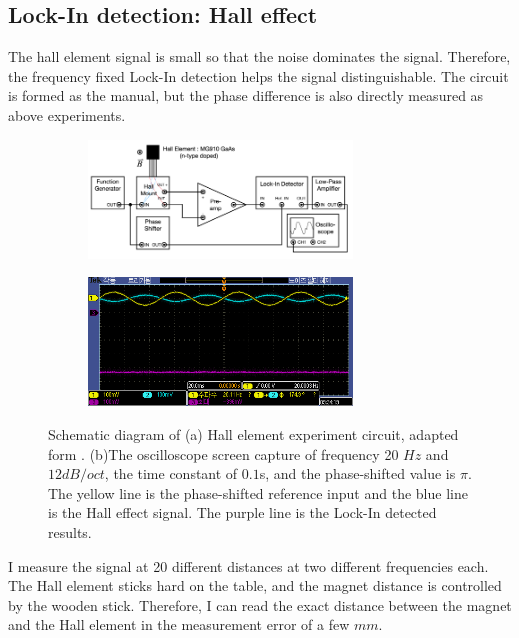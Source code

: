 \documentclass{article}
\begin{document}
 \subsection{Lock-In detection: Hall effect}
 The hall element signal is small so that the noise dominates the signal.
 Therefore, the frequency fixed Lock-In detection helps the signal distinguishable.
 The circuit is formed as the manual, but the phase difference is also directly measured as above experiments.
 \begin{figure}[ht]
    \centering
    \begin{subfigure}[b]{7cm}
        \centering
        \includegraphics[width=7cm]{../results/hall_sensor_circuit.png}
        \caption{}
    \end{subfigure}
    \hfill
    \begin{subfigure}[b]{7cm}
        \centering
        \includegraphics[width=7cm]{../raw_data/TEK00697.PNG}
        \caption{}
    \end{subfigure}
    \hfill
    \caption{Schematic diagram of (a) Hall element experiment circuit, adapted form  \cite{manual}.
    (b)The oscilloscope screen capture of frequency 20 $Hz$ and $12 dB/oct$, the time constant of $0.1$s, and the phase-shifted value is $\pi$.
    The yellow line is the phase-shifted reference input and the blue line is the Hall effect signal.
    The purple line is the Lock-In detected results.
    }
    \label{fig: hall_element_circuit}
  \end{figure}
 
 I measure the signal at 20 different distances at two different frequencies each.
 The Hall element sticks hard on the table, and the magnet distance is controlled by the wooden stick.
 Therefore, I can read the exact distance between the magnet and the Hall element in the measurement error of a few $mm$.
\end{document}

